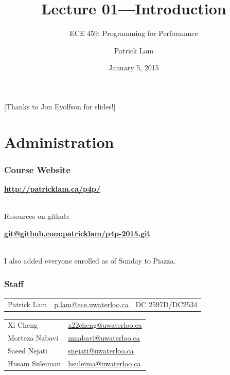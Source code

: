 \documentclass[aspectratio=43]{beamer}
\title{Lecture 01---Introduction}
\subtitle{ECE 459: Programming for Performance}
\author{Patrick Lam}
\institute{University of Waterloo}
\date{January 5, 2015}
\newenvironment{changemargin}[1]{%
  \begin{list}{}{%
    \setlength{\topsep}{0pt}%
    \setlength{\leftmargin}{#1}%
    \setlength{\rightmargin}{1em}
    \setlength{\listparindent}{\parindent}%
    \setlength{\itemindent}{\parindent}%
    \setlength{\parsep}{\parskip}%
  }%
  \item[]}{\end{list}}
\begin{document}
\begin{frame}[plain]
  \titlepage

\begin{center}
  [Thanks to Jon Eyolfson for slides!]
\end{center}
\end{frame}

\section{Administration}
\begin{frame}
  \frametitle{Course Website}

  \begin{changemargin}{2cm}
  \begin{center}
    \bf \url{http://patricklam.ca/p4p/}
  \end{center}
~\\

  Resources on github:
  \begin{center}
    \bf \url{git@github.com:patricklam/p4p-2015.git}
  \end{center}
  
~\\
  I also added everyone enrolled as of Sunday to Piazza.
  \end{changemargin}
\end{frame}

\begin{frame}
  \frametitle{Staff}

  \begin{center}
    {\bf {}}

    \begin{tabular}{lll}
      Patrick Lam &
      \href{mailto:p.lam@ece.uwaterloo.ca}{p.lam@ece.uwaterloo.ca} &
      DC 2597D/DC2534 \\
    \end{tabular}
    \vfill
    {\bf {}}

    \begin{tabular}{ll}
Xi Cheng &
\href{mailto:x22cheng@uwaterloo.ca}{x22cheng@uwaterloo.ca}\\
Morteza Nabavi &
\href{mailto:mnabavi@uwaterloo.ca}{mnabavi@uwaterloo.ca}\\
Saeed Nejati &
\href{mailto:snejati@uwaterloo.ca}{snejati@uwaterloo.ca}\\
Husam Suleiman &\href{mailto:hsuleima@uwaterloo.ca}{hsuleima@uwaterloo.ca}
    \end{tabular}
  \end{center}
\end{frame}
\end{document}

